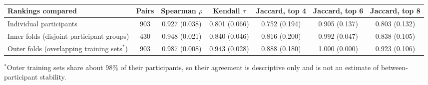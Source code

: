 \begin{table}[t]
\centering
\small
\caption{}
\label{tab:stability}
\setlength{\tabcolsep}{4pt}
\begin{adjustbox}{max width=\textwidth}
\begin{tabular}{lcccccc}
\toprule
Rankings compared & Pairs & Spearman $\rho$ & Kendall $\tau$ & Jaccard, top 4 & Jaccard, top 6 & Jaccard, top 8 \\
\midrule
Individual participants & 903 & 0.927 (0.038) & 0.801 (0.066) & 0.752 (0.194) & 0.905 (0.137) & 0.803 (0.132) \\
Inner folds (disjoint participant groups) & 430 & 0.948 (0.021) & 0.840 (0.046) & 0.816 (0.200) & 0.992 (0.047) & 0.838 (0.105) \\
Outer folds (overlapping training sets$^*$) & 903 & 0.987 (0.008) & 0.943 (0.028) & 0.888 (0.180) & 1.000 (0.000) & 0.923 (0.106) \\
\bottomrule
\end{tabular}
\end{adjustbox}
\par\smallskip\parbox{0.95\linewidth}{\footnotesize $^*$Outer training sets share about 98\% of their participants, so their agreement is descriptive only and is not an estimate of between-participant stability.}
\end{table}
